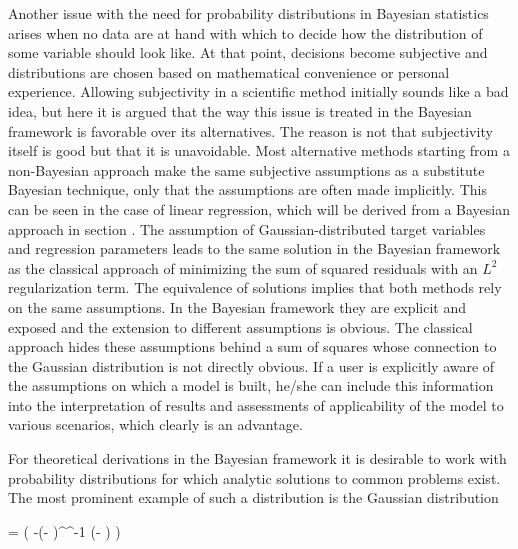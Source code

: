     Another issue with the need for probability distributions in Bayesian
    statistics arises when no data are at hand with which to decide how the
    distribution of some variable should look like. At that point, decisions
    become subjective and distributions are chosen based on mathematical
    convenience or personal experience. Allowing subjectivity in a scientific
    method initially sounds like a bad idea, but here it is argued that the way
    this issue is treated in the Bayesian framework is favorable over its
    alternatives. The reason is not that subjectivity itself is good but that
    it is unavoidable. Most alternative methods starting from a non-Bayesian
    approach make the same subjective assumptions as a substitute Bayesian
    technique, only that the assumptions are often made implicitly.
    This can be seen in the case of linear regression, which will be derived
    from a Bayesian approach in section . The
    assumption of Gaussian-distributed target variables and regression
    parameters leads to the same solution in the Bayesian framework as the
    classical approach of minimizing the sum of squared residuals with an $L^2$
    regularization term. The equivalence of solutions implies that both methods
    rely on the same assumptions. In the Bayesian framework they are explicit
    and exposed and the extension to different assumptions is obvious. The
    classical approach hides these assumptions behind a sum of squares whose
    connection to the Gaussian distribution is not directly obvious. If a user
    is explicitly aware of the assumptions on which a model is built, he/she
    can include this information into the interpretation of results and
    assessments of applicability of the model to various scenarios, which
    clearly is an advantage.

\stopsection

\startsection[title=The Multivariate Gaussian Distribution]

    For theoretical derivations in the Bayesian framework it is desirable to
    work with probability distributions for which analytic solutions to common
    problems exist. The most prominent example of such a distribution is the
    Gaussian distribution

    \placeformula[eq:gaussian]
    \startformula
        \GAUSS{\VECX}{\MEANVEC}{\COVMAT}
        = 
            \exp \left( -(\VECX - \MEANVEC)^\top \COVMAT^{-1}
            (\VECX - \MEANVEC) \right)
    \stopformula

